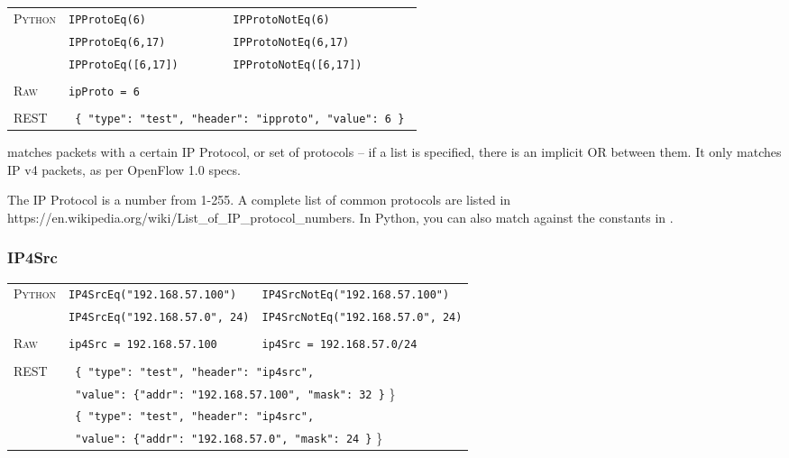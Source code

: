 \bigskip
\begin{tabularx}{\linewidth}{lXX}
\textsc{Python}   & \texttt{IPProtoEq(6)}    & \texttt{IPProtoNotEq(6)} \\
    & \texttt{IPProtoEq(6,17)}  & \texttt{IPProtoNotEq(6,17)} \\
    & \texttt{IPProtoEq([6,17])}  & \texttt{IPProtoNotEq([6,17])} \\ \\
\textsc{Raw}    & \texttt{ipProto = 6}     & \\ \\
\textsc{REST} & \multicolumn{2}{l}{\texttt{ \{ "type": "test", "header": "ipproto", "value": 6 \} }} 
\end{tabularx}

 matches packets with a certain IP Protocol, or set of protocols -- if a list is specified, 
there is an implicit OR between them.  It only matches IP v4 packets, as per OpenFlow 1.0 specs.  

The IP Protocol is a number from 1-255.  A complete list of common protocols are listed in 
https://en.wikipedia.org/wiki/List\_of\_IP\_protocol\_numbers.  In Python, you can also match against the
constants in .

\subsubsection{IP4Src}

\bigskip
\begin{tabularx}{\linewidth}{lXX}
\textsc{Python}   & \texttt{IP4SrcEq("192.168.57.100")}    & \texttt{IP4SrcNotEq("192.168.57.100")} \\
    & \texttt{IP4SrcEq("192.168.57.0", 24)}  & \texttt{IP4SrcNotEq("192.168.57.0", 24)} \\ \\
\textsc{Raw}    & \texttt{ip4Src = 192.168.57.100}     & \texttt{ip4Src = 192.168.57.0/24} \\ \\
\textsc{REST} & \multicolumn{2}{l}{\texttt{ \{ "type": "test", "header": "ip4src",}} \\
   & \multicolumn{2}{l}{\texttt{  "value": \{"addr": "192.168.57.100", "mask": 32 \}} \}} \\
   & \multicolumn{2}{l}{\texttt{ \{ "type": "test", "header": "ip4src",}} \\
   & \multicolumn{2}{l}{\texttt{  "value": \{"addr": "192.168.57.0", "mask": 24 \}} \}} \\
\end{tabularx}

